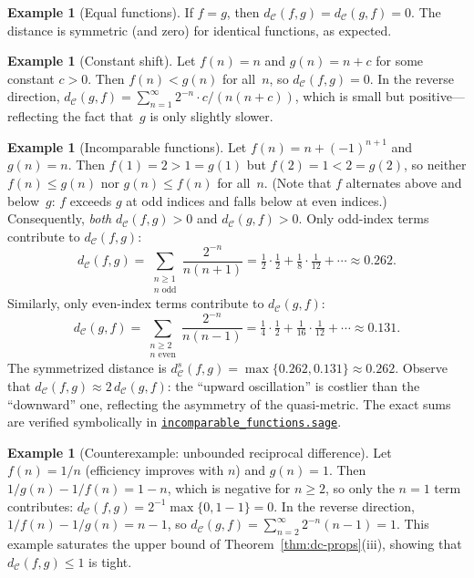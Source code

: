 \documentclass[11pt,a4paper]{article}
\newcommand{\repourl}{https://github.com/guydev42/expansive-homeomorphisms-complexity-qmetric}
\theoremstyle{plain}
\theoremstyle{definition}
\newtheorem{exampleinner}[theoreminner]{Example}
\newenvironment{example}[1][]{\begin{exampleinner}[#1]}{\end{exampleinner}}
\newcommand{\C}{\mathcal{C}}
\begin{document}
\begin{example}[Equal functions]\label{ex:equal}
If $f=g$, then $d_\C(f,g)=d_\C(g,f)=0$.  The distance is
symmetric (and zero) for identical functions, as expected.
\end{example}

\begin{example}[Constant shift]\label{ex:constant-shift}
Let $f(n)=n$ and $g(n)=n+c$ for some constant $c>0$.  Then
$f(n)<g(n)$ for all~$n$, so $d_\C(f,g)=0$.  In the reverse
direction, $d_\C(g,f)=\sum_{n=1}^\infty 2^{-n}\cdot c/(n(n+c))$,
which is small but positive---reflecting the fact that~$g$ is only
slightly slower.
\end{example}


\begin{example}[Incomparable functions]\label{ex:incomparable}
Let $f(n)=n+(-1)^{n+1}$ and $g(n)=n$.  Then $f(1)=2>1=g(1)$ but
$f(2)=1<2=g(2)$, so neither $f(n)\le g(n)$ nor $g(n)\le f(n)$
for all~$n$.  (Note that $f$ alternates above and below~$g$: $f$
exceeds $g$ at odd indices and falls below at even indices.)
Consequently, \emph{both} $d_\C(f,g)>0$ and $d_\C(g,f)>0$.
Only odd-index terms contribute to $d_\C(f,g)$:
\[
  d_\C(f,g) = \sum_{\substack{n\ge 1\\n\text{ odd}}}
  \frac{2^{-n}}{n(n+1)}
  = \tfrac{1}{2}\cdot\tfrac{1}{2}
    +\tfrac{1}{8}\cdot\tfrac{1}{12}+\cdots
  \approx 0.262.
\]
Similarly, only even-index terms contribute to $d_\C(g,f)$:
\[
  d_\C(g,f) = \sum_{\substack{n\ge 2\\n\text{ even}}}
  \frac{2^{-n}}{n(n-1)}
  = \tfrac{1}{4}\cdot\tfrac{1}{2}
    +\tfrac{1}{16}\cdot\tfrac{1}{12}+\cdots
  \approx 0.131.
\]
The symmetrized distance is
$d_\C^s(f,g)=\max\{0.262,0.131\}\approx 0.262$.
Observe that $d_\C(f,g)\approx 2\,d_\C(g,f)$: the
``upward oscillation'' is costlier than the ``downward'' one,
reflecting the asymmetry of the quasi-metric.
The exact sums are verified symbolically in
\href{\repourl/blob/main/code/sagemath/incomparable_functions.sage}{\texttt{incomparable\_functions.sage}}.
\end{example}

\begin{example}[Counterexample: unbounded reciprocal difference]\label{ex:counter-bounded}
Let $f(n)=1/n$ (efficiency improves with $n$) and $g(n)=1$.  Then
$1/g(n)-1/f(n)=1-n$, which is negative for $n\ge 2$, so only
the $n=1$ term contributes: $d_\C(f,g)=2^{-1}\max\{0,1-1\}=0$.
In the reverse direction, $1/f(n)-1/g(n)=n-1$, so
$d_\C(g,f)=\sum_{n=2}^\infty 2^{-n}(n-1)=1$.  This example
saturates the upper bound of Theorem~\ref{thm:dc-props}(iii),
showing that $d_\C(f,g)\le 1$ is tight.
\end{example}
\end{document}
